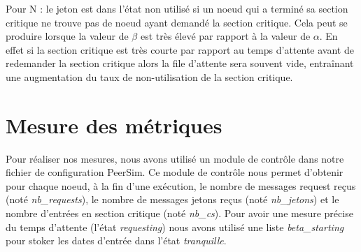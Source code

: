 \documentclass[12pt,a4paper]{article}
\begin{document}
Pour N : le jeton est dans l'état non utilisé si un noeud qui a terminé sa section critique ne trouve pas de noeud ayant demandé la section critique. Cela peut se produire lorsque la valeur de $\beta$ est très élevé par rapport à la valeur de $\alpha$. En effet si la section critique est très courte par rapport au temps d'attente avant de redemander la section critique alors la file d'attente sera souvent vide, entraînant une augmentation du taux de non-utilisation de la section critique. 


\section{Mesure des métriques}

Pour réaliser nos mesures, nous avons utilisé un module de contrôle dans notre fichier de configuration PeerSim. Ce module de contrôle nous permet d'obtenir pour chaque noeud, à la fin d'une exécution, le nombre de messages request reçus (noté \textit{nb\_requests}), le nombre de messages jetons reçus (noté \textit{nb\_jetons}) et le nombre d'entrées en section critique (noté \textit{nb\_cs}). Pour avoir une mesure précise du temps d'attente (l'état \textit{requesting}) nous avons utilisé une liste \textit{beta\_starting} pour stoker les dates d'entrée dans l'état \textit{tranquille}.
\end{document}
